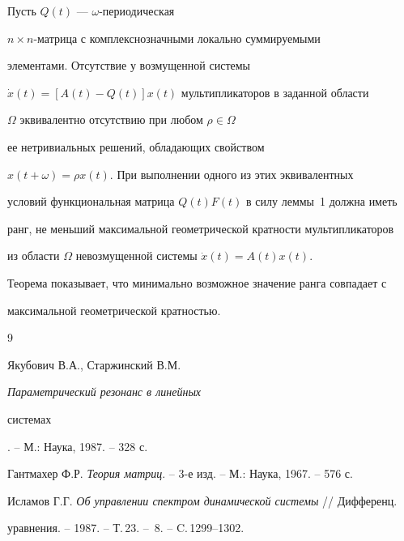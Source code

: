 \begin{notenonum} Пусть $Q(t)$ --- $\omega$-периодическая


$n\times n$-матрица с комплекснозначными локально суммируемыми


элементами. Отсутствие у возмущенной системы


$\Dot x(t) = [A(t) - Q(t)]x(t)$ мультипликаторов в заданной области


$\Omega$ эквивалентно отсутствию при любом $\rho\in\Omega$


ее нетривиальных решений, обладающих свойством


$x(t+\omega) = \rho x(t)$. При выполнении одного из этих эквивалентных


условий функциональная матрица $Q(t)F(t)$ в силу леммы~1 должна иметь


ранг, не меньший максимальной геометрической кратности мультипликаторов


из области $\Omega$ невозмущенной системы $\Dot x(t) = A(t)x(t)$.


Теорема показывает, что минимально возможное значение ранга совпадает с


максимальной геометрической кратностью.


\end{notenonum}





\begin{thebibliography}{9}







Якубович В.А., Старжинский В.М. {\em Параметрический резонанс в линейных


системах}. -- М.: Наука, 1987. -- 328 с.




Гантмахер Ф.Р. {\em Теория матриц}. -- 3-е изд. -- М.: Наука, 1967. -- 576 с.




Исламов Г.Г. {\em Об управлении спектром динамической системы} // Дифференц.


уравнения. -- 1987. -- Т.\,23. -- \No\,8. -- C.\,1299--1302.





\end{thebibliography}





\vskip 2cm












\label{end}





